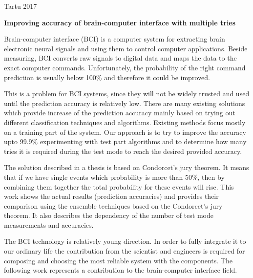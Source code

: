 \documentclass[12pt]{article}
\begin{document}
\vfill
\centerline{Tartu 2017}



\newpage
{}
\noindent\textbf{\large Improving accuracy of brain-computer interface with multiple tries}
\vspace*{2ex}
{ }

Brain-computer interface (BCI) is a computer system for extracting brain electronic neural signals and using them to control computer applications. Beside measuring, BCI converts raw signals to digital data and maps the data to the exact computer commands. Unfortunately, the probability of the right command prediction is usually below 100\% and therefore it could be improved.

This is a problem for BCI systems, since they will not be widely trusted and used until the prediction accuracy is relatively low. There are many existing solutions which provide increase of the prediction accuracy mainly based on trying out different classification techniques and algorithms. Existing methods focus mostly on a training part of the system. Our approach is to try to improve the accuracy upto 99.9\% experimenting with test part algorithms and to determine how many tries it is required during the test mode to reach the desired provided accuracy.

The solution described in a thesis is based on Condorcet's jury theorem. It means that if we have single events which probability is more than 50\%, then by combining them together the total probability for these events will rise. This work shows the actual results (prediction accuracies) and provides their comparison using the ensemble techniques based on the Condorcet's jury theorem. It also describes the dependency of the number of test mode measurements and accuracies.

The BCI technology is relatively young direction. In order to fully integrate it to our ordinary life the contribution from the scientist and engineers is required for composing and choosing the most reliable system with the components. The following work represents a contribution to the brain-computer interface field.
\end{document}

